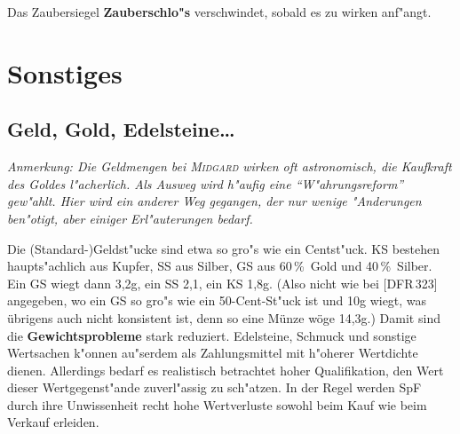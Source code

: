 \documentclass[10pt,a4paper,germanpar]{article}
\begin{document}
Das Zaubersiegel \textbf{Zauberschlo"s} verschwindet, sobald es zu
wirken anf"angt.



\section{Sonstiges}

\subsection{Geld, Gold, Edelsteine\dots}

\emph{Anmerkung: Die Geldmengen bei \textsc{Midgard} wirken oft
  astronomisch, die Kaufkraft des Goldes l"acherlich. Als Ausweg wird
  h"aufig eine "`W"ahrungsreform"' gew"ahlt. Hier wird ein anderer Weg
  gegangen, der nur wenige "Anderungen ben"otigt, aber einiger
  Erl"auterungen bedarf.}

Die (Standard-)Geldst"ucke sind etwa so gro"s wie ein Centst"uck.
KS bestehen haupts"achlich aus Kupfer, SS aus Silber, GS aus 60\,\%\ 
Gold und 40\,\%\ Silber. Ein GS wiegt dann 3,2g, ein SS 2,1, ein KS
1,8g.  (Also nicht wie bei [DFR\,323] angegeben, wo ein GS so gro"s
wie ein 50-Cent-St"uck ist und 10g wiegt, was übrigens auch nicht
konsistent ist, denn so eine Münze wöge 14,3g.)  Damit sind die
\textbf{Gewichtsprobleme} stark reduziert. Edelsteine, Schmuck und
sonstige Wertsachen k"onnen au"serdem als Zahlungsmittel mit h"oherer
Wertdichte dienen.  Allerdings bedarf es realistisch betrachtet hoher
Qualifikation, den Wert dieser Wertgegenst"ande zuverl"assig zu
sch"atzen. In der Regel werden SpF durch ihre Unwissenheit recht hohe
Wertverluste sowohl beim Kauf wie beim Verkauf erleiden.

\end{document}
